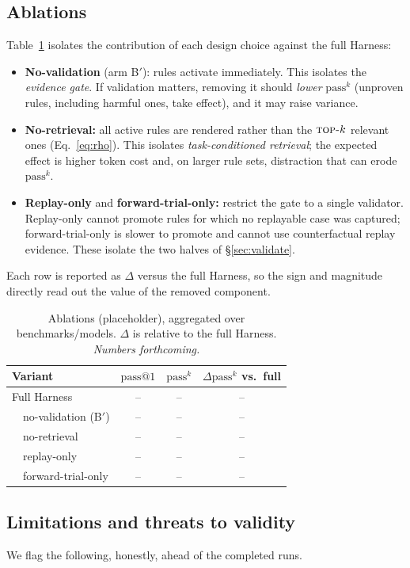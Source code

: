 \documentclass[letterpaper]{article} %
\makeatletter
\newcommand{\passk}{\mathrm{pass}^{k}}
\newcommand{\passone}{\mathrm{pass@}1}
\newcommand{\TBD}{--}                             %
\newcommand{\topk}{\textsc{top-}k}
\makeatother
\begin{document}
\subsection{Ablations}
\label{sec:ablations}
Table~\ref{tab:ablation} isolates the contribution of each design choice against the full
Harness:
\begin{itemize}\itemsep2pt
\item \textbf{No-validation} (arm B$'$): rules activate immediately. This isolates the
\emph{evidence gate}. If validation matters, removing it should \emph{lower} $\passk$ (unproven
rules, including harmful ones, take effect), and it may raise variance.
\item \textbf{No-retrieval:} all active rules are rendered rather than the $\topk$ relevant
ones (Eq.~\eqref{eq:rho}). This isolates \emph{task-conditioned retrieval}; the expected effect
is higher token cost and, on larger rule sets, distraction that can erode $\passk$.
\item \textbf{Replay-only} and \textbf{forward-trial-only:} restrict the gate to a single
validator. Replay-only cannot promote rules for which no replayable case was captured;
forward-trial-only is slower to promote and cannot use counterfactual replay evidence. These
isolate the two halves of \S\ref{sec:validate}.
\end{itemize}
Each row is reported as $\Delta$ versus the full Harness, so the sign and magnitude directly
read out the value of the removed component.

\begin{table}[t]
\centering\small
\caption{Ablations (placeholder), aggregated over benchmarks/models. $\Delta$ is relative to the
full Harness. \emph{Numbers forthcoming.}}
\label{tab:ablation}
\begin{tabular}{@{}lccc@{}}
\toprule
Variant & $\passone$ & $\passk$ & $\Delta\passk$ vs.\ full \\
\midrule
Full Harness         & \TBD & \TBD & -- \\
\ \ no-validation (B$'$) & \TBD & \TBD & \TBD \\
\ \ no-retrieval     & \TBD & \TBD & \TBD \\
\ \ replay-only      & \TBD & \TBD & \TBD \\
\ \ forward-trial-only & \TBD & \TBD & \TBD \\
\bottomrule
\end{tabular}
\end{table}

\subsection{Limitations and threats to validity}
\label{sec:limitations}
We flag the following, honestly, ahead of the completed runs.
\end{document}
